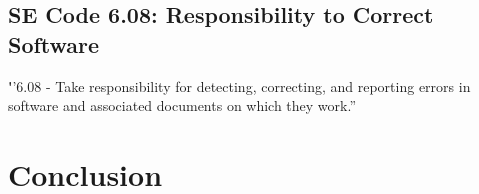 \documentclass[11pt]{article}
\begin{document}
\begin{multicols}{2}
\subsection{SE Code 6.08: Responsibility to Correct Software}

{\textbf''6.08 - Take responsibility for detecting, correcting, and reporting errors in software and associated documents on which they work.''}


\section{Conclusion}

\end{multicols}
\newpage


\nocite{*}




\end{document}

